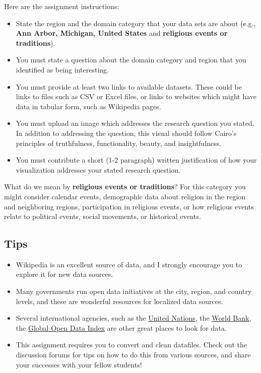 \documentclass[11pt]{article}
\providecommand{\tightlist}{%
      \setlength{\itemsep}{0pt}\setlength{\parskip}{0pt}}
\begin{document}
Here are the assignment instructions:

\begin{itemize}
\tightlist
\item
  State the region and the domain category that your data sets are about
  (e.g., \textbf{Ann Arbor, Michigan, United States} and
  \textbf{religious events or traditions}).
\item
  You must state a question about the domain category and region that
  you identified as being interesting.
\item
  You must provide at least two links to available datasets. These could
  be links to files such as CSV or Excel files, or links to websites
  which might have data in tabular form, such as Wikipedia pages.
\item
  You must upload an image which addresses the research question you
  stated. In addition to addressing the question, this visual should
  follow Cairo's principles of truthfulness, functionality, beauty, and
  insightfulness.
\item
  You must contribute a short (1-2 paragraph) written justification of
  how your visualization addresses your stated research question.
\end{itemize}

What do we mean by \textbf{religious events or traditions}? For this
category you might consider calendar events, demographic data about
religion in the region and neighboring regions, participation in
religious events, or how religious events relate to political events,
social movements, or historical events.

\subsection{Tips}\label{tips}

\begin{itemize}
\tightlist
\item
  Wikipedia is an excellent source of data, and I strongly encourage you
  to explore it for new data sources.
\item
  Many governments run open data initiatives at the city, region, and
  country levels, and these are wonderful resources for localized data
  sources.
\item
  Several international agencies, such as the
  \href{http://data.un.org/}{United Nations}, the
  \href{http://data.worldbank.org/}{World Bank}, the
  \href{http://index.okfn.org/place/}{Global Open Data Index} are other
  great places to look for data.
\item
  This assignment requires you to convert and clean datafiles. Check out
  the discussion forums for tips on how to do this from various sources,
  and share your successes with your fellow students!
\end{itemize}
\end{document}
